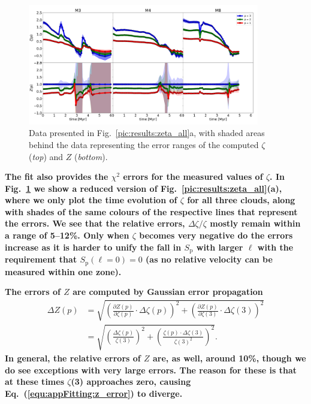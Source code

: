 \begin{figure}
    \centering
    \includegraphics[width=0.9\textwidth]{error_vsf04_zeta_z.pdf}
    \caption{
        Data presented in Fig.~\ref{pic:results:zeta_all}a, with
        shaded areas behind the data representing the error ranges of the computed $\zeta$ (\textit{top}) and $Z$ (\textit{bottom}).  
    }
    \label{pic:appFitting:error_vsfhr04_zeta_z}
\end{figure}


\textbf{
     The fit also provides    
the $\chi^2$ errors for the measured values of $\zeta$. 
    In Fig.~\ref{pic:appFitting:error_vsfhr04_zeta_z} we show a reduced version of Fig.~\ref{pic:results:zeta_all}(a), where
    we only plot the time evolution of $\zeta$ for all three clouds, along with
shades of the same colours of the respective lines that represent the errors.
    We see that the relative errors, $\Delta \zeta / \zeta$ mostly remain within a range of 5--12\%. 
    Only when $\zeta$ becomes very negative do the errors increase as it is harder to unify the fall in $S_\mathrm{p}$ with larger $\ell$ with the requirement that $S_\mathrm{p} (\ell=0)=0$ (as no relative velocity can be measured within one zone).
}

\textbf{
    The errors of $Z$ are computed by Gaussian error propagation
}
\begin{align}\Delta Z(p) &= \sqrt{ \left( \frac{\partial Z(p)}{\partial \zeta(p)} \cdot \Delta\zeta(p) \right)^2 + \left( \frac{\partial Z(p)}{\partial \zeta(3)} \cdot \Delta\zeta(3) \right)^2 } \\
        &= \sqrt{ \left( \frac{\Delta\zeta(p)}{\zeta(3)} \right)^2 + \left( \frac{ \zeta(p) \cdot \Delta\zeta(3)}{\zeta(3)^2} \right)^2 }.
        \label{equ:appFitting:z_error}
\end{align}
\textbf{
    \noindent In general, the relative errors of $Z$ are, as well, around 10\%, though
     we do see exceptions with very large errors. 
    The reason for these is that at these times $\zeta$(3) approaches zero, causing Eq.~(\ref{equ:appFitting:z_error}) to diverge.
}



\endinput
